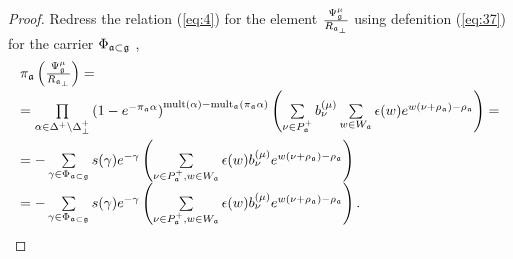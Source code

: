 \documentclass[12pt]{iopart}
\theoremstyle{definition}
\newcommand{\af}{\mathfrak{a}}
\begin{document}
\begin{proof}
Redress the relation (\ref{eq:4}) for the element $
\frac{\Psi _{\frak{g}}^{\mu }}{R_{\af_{\perp }}}$ using defenition (\ref{eq:37})
for the carrier $\Phi _{\af\subset \frak{g}}$ ,
\begin{equation*}
\begin{array}{l}
\pi _{\frak{a}}\left( \frac{\Psi _{\frak{g}}^{\mu }}{R_{\af_{\perp }}}%
\right) = \\[2mm]
=\prod\limits_{\alpha \in \Delta ^{+}\setminus \Delta _{\bot }^{+}}\left(
1-e^{-\pi _{\af}\alpha }\right) ^{\mathrm{mult}(\alpha )-\mathrm{mult}_{%
\af}(\pi _{\af}\alpha )}\left( \sum\limits_{\nu \in P_{\af%
}^{+}}b_{\nu }^{(\mu )}\sum\limits_{w\in W_{\af}}\epsilon (w)e^{w(\nu
+\rho _{\af})-\rho _{\af}}\right) = \\[5mm]
=-\sum\limits_{\gamma \in \Phi _{\af\subset \frak{g}}}s(\gamma
)e^{-\gamma }\left( \sum\limits_{\nu \in P_{\af}^{+},w\in W_{\af%
}}\epsilon (w)b_{\nu }^{(\mu )}e^{w(\nu +\rho _{\af})-\rho _{\af%
}}\right)  \\
=-\sum\limits_{\gamma \in \Phi _{\af\subset \frak{g}}}s(\gamma
)e^{-\gamma }\left( \sum\limits_{\nu \in P_{\af}^{+},w\in W_{\af%
}}\epsilon (w)b_{\nu }^{(\mu )}e^{w(\nu +\rho _{\af})-\rho _{\af%
}}\right) .
\end{array}
\end{equation*}


\end{proof}
\end{document}
